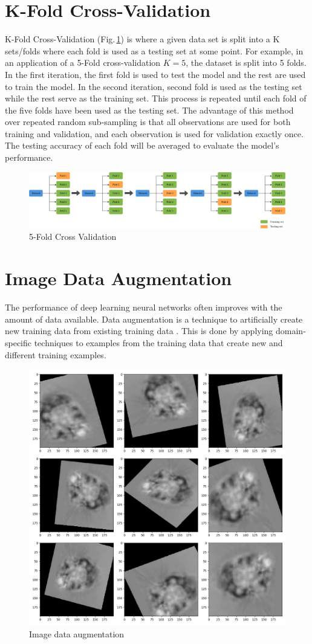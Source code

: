 \section{K-Fold Cross-Validation}
\label{backgournd_kfold}
K-Fold Cross-Validation \citep{Kohavi95astudy} (Fig.\,\ref{kfold}) is where a given data set is split into a K sets/folds where each fold is used as a testing set at some point. For example, in an application of a 5-Fold cross-validation $K=5$, the dataset is split into 5 folds. In the first iteration, the first fold is used to test the model and the rest are used to train the model. In the second iteration, second fold is used as the testing set while the rest serve as the training set. This process is repeated until each fold of the five folds have been used as the testing set. The advantage of this method over repeated random sub-sampling is that all observations are used for both training and validation, and each observation is used for validation exactly once. The testing accuracy of each fold will be averaged to evaluate the model's performance. 

\begin{figure}[h]
	\centering
	\includegraphics[width=\textwidth]{Figs/kfold.png}
    \caption{5-Fold Cross Validation \citep{k-fold}}
    \label{kfold}
\end{figure}


\section{Image Data Augmentation}
\label{backgournd_aug}

The performance of deep learning neural networks often improves with the amount of data available. Data augmentation is a technique to artificially create new training data from existing training data \citep{Mikolajczyk2018}. This is done by applying domain-specific techniques to examples from the training data that create new and different training examples.

\begin{figure}[h]
	\centering
	\includegraphics[width=.5\textwidth]{Figs/dataaug.jpg}
    \caption{Image data augmentation}
    \label{dataaug}
\end{figure}

